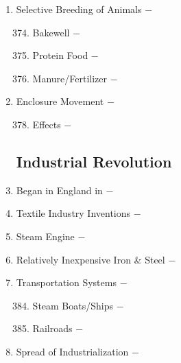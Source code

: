 \documentclass[12pt]{article}
\begin{document}
\begin{enumerate}
\begin{enumerate}[label=\arabic{*}.]
\end{enumerate}
\setcounter{enumi}{372}

\item Selective Breeding of Animals $-$ 

\begin{enumerate}[label=\arabic{*}.]
\setcounter{enumii}{373}

\item Bakewell $-$

\item Protein Food $-$

\item Manure/Fertilizer $-$ 


\end{enumerate}
\setcounter{enumi}{376}

\item Enclosure Movement $-$ 

\begin{enumerate}[label=\arabic{*}.]
\setcounter{enumii}{377}

\item Effects $-$ 

\end{enumerate}
\setcounter{enumi}{378}

\subsection{Industrial Revolution}

\item Began in England in $-$ 

\item Textile Industry Inventions $-$ 

\item Steam Engine $-$ 

\item Relatively Inexpensive Iron \& Steel $-$

\item Transportation Systems $-$

\begin{enumerate}[label=\arabic{*}.]
\setcounter{enumii}{383}

\item Steam Boats/Ships $-$

\item Railroads $-$ 


\end{enumerate}
\setcounter{enumi}{385}

\item Spread of Industrialization $-$ 


\end{enumerate}
\end{document}
